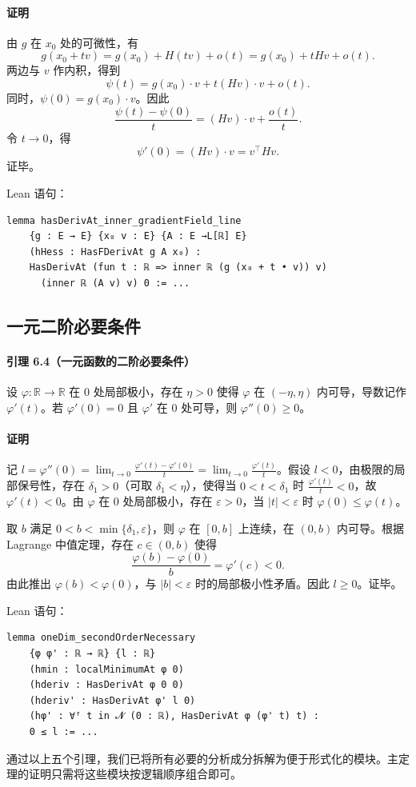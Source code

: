 ﻿\documentclass[UTF8,a4paper,zihao=-4]{ctexart}
\begin{document}
\paragraph{证明}由 \(g\) 在 \(x_0\) 处的可微性，有
\[
g(x_0+tv)=g(x_0)+H(tv)+o(t)=g(x_0)+tHv+o(t).
\]
两边与 \(v\) 作内积，得到
\[
\psi(t)=g(x_0)\cdot v+t(Hv)\cdot v+o(t).
\]
同时，\(\psi(0)=g(x_0)\cdot v\)。因此
\[
\frac{\psi(t)-\psi(0)}{t}=(Hv)\cdot v+\frac{o(t)}{t}.
\]
令 \(t\to0\)，得
\[
\psi'(0)=(Hv)\cdot v=v^{\top}Hv.
\]
证毕。

Lean 语句：
\begin{verbatim}
lemma hasDerivAt_inner_gradientField_line
    {g : E → E} {x₀ v : E} {A : E →L[ℝ] E}
    (hHess : HasFDerivAt g A x₀) :
    HasDerivAt (fun t : ℝ => inner ℝ (g (x₀ + t • v)) v)
      (inner ℝ (A v) v) 0 := ...
\end{verbatim}

\subsection{一元二阶必要条件}
\paragraph{引理 6.4（一元函数的二阶必要条件）}设 \(\varphi:\mathbb{R}\to\mathbb{R}\) 在 \(0\) 处局部极小，存在 \(\eta>0\) 使得 \(\varphi\) 在 \((-\eta,\eta)\) 内可导，导数记作 \(\varphi'(t)\)。若 \(\varphi'(0)=0\) 且 \(\varphi'\) 在 \(0\) 处可导，则 \(\varphi''(0)\ge 0\)。

\paragraph{证明}记 \(l=\varphi''(0)=\lim_{t\to0}\frac{\varphi'(t)-\varphi'(0)}{t}=\lim_{t\to0}\frac{\varphi'(t)}{t}\)。假设 \(l<0\)，由极限的局部保号性，存在 \(\delta_1>0\)（可取 \(\delta_1<\eta\)），使得当 \(0<t<\delta_1\) 时 \(\frac{\varphi'(t)}{t}<0\)，故 \(\varphi'(t)<0\)。由 \(\varphi\) 在 \(0\) 处局部极小，存在 \(\varepsilon>0\)，当 \(|t|<\varepsilon\) 时 \(\varphi(0)\le\varphi(t)\)。

取 \(b\) 满足 \(0<b<\min\{\delta_1,\varepsilon\}\)，则 \(\varphi\) 在 \([0,b]\) 上连续，在 \((0,b)\) 内可导。根据 Lagrange 中值定理，存在 \(c\in(0,b)\) 使得
\[
\frac{\varphi(b)-\varphi(0)}{b} = \varphi'(c) < 0.
\]
由此推出 \(\varphi(b)<\varphi(0)\)，与 \(|b|<\varepsilon\) 时的局部极小性矛盾。因此 \(l\ge 0\)。证毕。

Lean 语句：
\begin{verbatim}
lemma oneDim_secondOrderNecessary
    {φ φ' : ℝ → ℝ} {l : ℝ}
    (hmin : localMinimumAt φ 0)
    (hderiv : HasDerivAt φ 0 0)
    (hderiv' : HasDerivAt φ' l 0)
    (hφ' : ∀ᶠ t in 𝓝 (0 : ℝ), HasDerivAt φ (φ' t) t) :
    0 ≤ l := ...
\end{verbatim}
通过以上五个引理，我们已将所有必要的分析成分拆解为便于形式化的模块。主定理的证明只需将这些模块按逻辑顺序组合即可。
\end{document}
